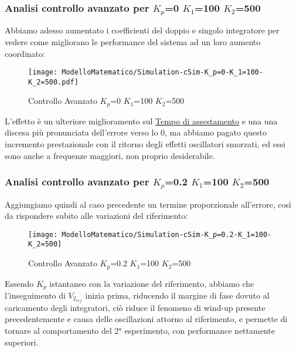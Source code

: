 \subsubsection{Analisi controllo avanzato per $ K_p $=0 $ K_1 $=100 $ K_2 $=500}
Abbiamo adesso aumentato i coefficienti del doppio e singolo integratore per vedere come migliorano le performance del sistema ad un loro aumento coordinato:
\begin{figure}[H]
	\centering
	\caption[Controllo Avanzato $ K_p $=0 $ K_1 $=100 $ K_2 $=500]{Controllo Avanzato $ K_p $=0 $ K_1 $=100 $ K_2 $=500}
	\texttt{[image: ModelloMatematico/Simulation-cSim-K\_p=0-K\_1=100-K\_2=500.pdf]}
\end{figure}
\noindent
L'effetto è un ulteriore miglioramento sul \underline{Tempo di assestamento} e una una discesa più pronunciata dell'errore verso lo 0, ma abbiamo pagato questo incremento prestazionale con il ritorno degli effetti oscillatori smorzati, ed essi sono anche a frequenze maggiori, non proprio desiderabile.

\newpage

\subsubsection{Analisi controllo avanzato per $ K_p $=0.2 $ K_1 $=100 $ K_2 $=500}
Aggiungiamo quindi al caso precedente un termine proporzionale all'errore, così da rispondere subito alle variazioni del riferimento:
\begin{figure}[H]
	\centering
	\caption[Controllo Avanzato $ K_p $=0.2 $ K_1 $=100 $ K_2 $=500]{Controllo Avanzato $ K_p $=0.2 $ K_1 $=100 $ K_2 $=500}
	\texttt{[image: ModelloMatematico/Simulation-cSim-K\_p=0.2-K\_1=100-K\_2=500]}
\end{figure}
\noindent
Essendo $ K_p $ istantaneo con la variazione del riferimento, abbiamo che l'inseguimento di $ V_{2_{ref}} $ inizia prima, riducendo il margine di fase dovuto al caricamento degli integratori, ciò riduce il fenomeno di wind-up presente precedentemente e causa delle oscillazioni attorno al riferimento, e permette di tornare al comportamento del 2° esperimento, con performance nettamente superiori.

\newpage

